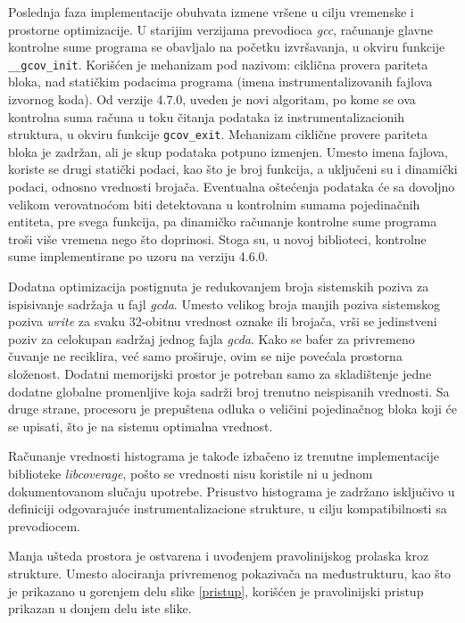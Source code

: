 \documentclass[12pt,oneside]{memoir}
\newcommand{\kod}[1]{\texttt{#1}}
\newcommand{\strano}[1]{\textit{#1}}
\begin{document}
Poslednja faza implementacije obuhvata izmene vršene u cilju vremenske i prostorne optimizacije. U starijim verzijama prevodioca \strano{gcc}, računanje glavne kontrolne sume programa se obavljalo na početku izvršavanja, u okviru funkcije \kod{\_\_gcov\_init}. Korišćen je mehanizam pod nazivom: ciklična provera pariteta bloka, nad statičkim podacima programa (imena instrumentalizovanih fajlova izvornog koda). Od verzije 4.7.0, uveden je novi algoritam, po kome se ova kontrolna suma računa u toku čitanja podataka iz instrumentalizacionih struktura, u okviru funkcije \kod{gcov\_exit}. Mehanizam ciklične provere pariteta bloka je zadržan, ali je skup podataka potpuno izmenjen. Umesto imena fajlova, koriste se drugi statički podaci, kao što je broj funkcija, a uključeni su i dinamički podaci, odnosno vrednosti brojača. Eventualna oštećenja podataka će sa dovoljno velikom verovatnoćom biti detektovana u kontrolnim sumama pojedinačnih entiteta, pre svega funkcija, pa dinamičko računanje kontrolne sume programa troši više vremena nego što doprinosi. Stoga su, u novoj biblioteci, kontrolne sume implementirane po uzoru na verziju 4.6.0. 

Dodatna optimizacija postignuta je redukovanjem broja sistemskih poziva za ispisivanje sadržaja u fajl \strano{gcda}. Umesto velikog broja manjih poziva sistemskog poziva \strano{write} za svaku 32-obitnu vrednost oznake ili brojača, vrši se jedinstveni poziv za celokupan sadržaj jednog fajla \strano{gcda}. Kako se bafer za privremeno čuvanje ne reciklira, već samo proširuje, ovim se nije povećala prostorna složenost. Dodatni memorijski prostor je potreban samo za skladištenje jedne dodatne globalne promenljive koja sadrži broj trenutno neispisanih vrednosti. Sa druge strane, procesoru je prepuštena odluka o veličini pojedinačnog bloka koji će se upisati, što je na sistemu optimalna vrednost. 

Računanje vrednosti histograma je takođe izbačeno iz trenutne implementacije biblioteke \strano{libcoverage}, pošto se vrednosti nisu koristile ni u jednom dokumentovanom slučaju upotrebe. Prisustvo histograma je zadržano isključivo u definiciji odgovarajuće instrumentalizacione strukture, u cilju kompatibilnosti sa prevodiocem. 

Manja ušteda prostora je ostvarena i uvođenjem pravolinijskog prolaska kroz strukture. Umesto alociranja privremenog pokazivača na međustrukturu, kao što je prikazano u gorenjem delu slike \ref{pristup}, korišćen je pravolinijski pristup prikazan u donjem delu iste slike. 
\end{document}
